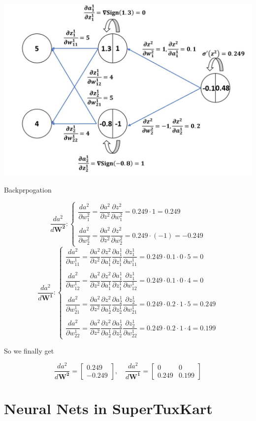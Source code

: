 \documentclass{article}
\begin{document}
		$$$$
        \begin{minipage}[t]{\linewidth}
        		\captionsetup{type=figure}
               	\centering
               	\includegraphics[width=0.6\linewidth]
                				{images/Q2b.jpg}
                \caption{Backprpogation}      
        \end{minipage} 
        
		\newpage        
		\[
  			\dfrac{da^2}{d\boldsymbol{W^2}}:
  			\begin{cases}
               \dfrac{da^2}{\partial{w^2_{1}}}=\dfrac{\partial a^2}{\partial{z^2}}\dfrac{\partial z^2}{\partial{w^2_1}}=0.249\cdot1=0.249\\\\
               \dfrac{da^2}{\partial{w^2_{2}}}=\dfrac{\partial a^2}{\partial{z^2}}\dfrac{\partial z^2}{\partial{w^2_2}}=0.249\cdot(-1)=-0.249
            \end{cases}
		\]
		$$$$
		\[
  			\dfrac{da^2}{d\boldsymbol{W^1}}:
  			\begin{cases}
               \dfrac{da^2}{\partial{w^1_{11}}}=\dfrac{\partial a^2}{\partial{z^2}}\dfrac{\partial z^2}{\partial{a^1_1}}\dfrac{\partial a^1_1}{\partial{z^1_1}}\dfrac{\partial z^1_1}{\partial{w^1_{11}}}=0.249\cdot0.1\cdot0\cdot5=0\\\\
               \dfrac{da^2}{\partial{w^1_{12}}}=\dfrac{\partial a^2}{\partial{z^2}}\dfrac{\partial z^2}{\partial{a^1_1}}\dfrac{\partial a^1_1}{\partial{z^1_1}}\dfrac{\partial z^1_1}{\partial{w^1_{12}}}=0.249\cdot0.1\cdot0\cdot4=0\\\\
               \dfrac{da^2}{\partial{w^1_{21}}}=\dfrac{\partial a^2}{\partial{z^2}}\dfrac{\partial z^2}{\partial{a^1_2}}\dfrac{\partial a^1_2}{\partial{z^1_2}}\dfrac{\partial z^1_2}{\partial{w^1_{21}}}=0.249\cdot0.2\cdot1\cdot5=0.249\\\\
               \dfrac{da^2}{\partial{w^1_{22}}}=\dfrac{\partial a^2}{\partial{z^2}}\dfrac{\partial z^2}{\partial{a^1_2}}\dfrac{\partial a^1_2}{\partial{z^1_2}}\dfrac{\partial z^1_2}{\partial{w^1_{22}}}=0.249\cdot0.2\cdot1\cdot4=0.199
            \end{cases}
		\]
		
    	So we finally get
    	
    	$$\dfrac{da^2}{d\boldsymbol{W^2}}=\begin{bmatrix}0.249\\-0.249\end{bmatrix},\quad \dfrac{da^2}{d\boldsymbol{W^1}}=\begin{bmatrix}0 & 0\\0.249 & 0.199\end{bmatrix}$$
    	$$$$
			
        
    \section{Neural Nets in SuperTuxKart}
       
\end{document}
